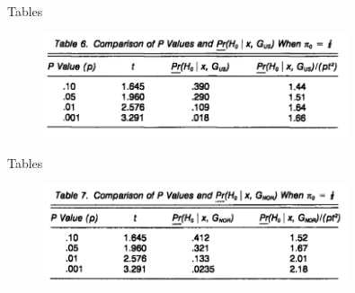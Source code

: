 \begin{frame}{Tables}

\begin{figure}[t]
\includegraphics[width=0.8\textwidth]{figures/table6}
\centering
\end{figure}

\end{frame}



\begin{frame}{Tables}

\begin{figure}[t]
\includegraphics[width=0.8\textwidth]{figures/table7}
\centering
\end{figure}

\end{frame}



